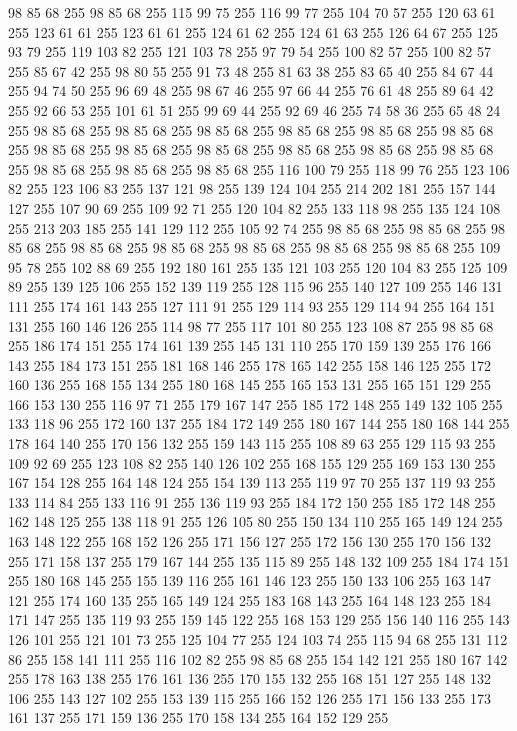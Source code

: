 98 85 68 255 98 85 68 255 115 99 75 255 116 99 77 255 104 70 57 255 120 63 61 255 123 61 61 255 123 61 61 255 124 61 62 255 124 61 63 255 126 64 67 255 125 93 79 255 119 103 82 255 121 103 78 255 97 79 54 255 100 82 57 255 100 82 57 255 85 67 42 255 98 80 55 255 91 73 48 255 81 63 38 255 83 65 40 255 84 67 44 255 94 74 50 255 96 69 48 255 98 67 46 255 97 66 44 255 76 61 48 255 89 64 42 255 92 66 53 255 101 61 51 255 99 69 44 255 92 69 46 255 74 58 36 255 65 48 24 255 98 85 68 255 98 85 68 255 98 85 68 255 98 85 68 255 98 85 68 255 98 85 68 255 98 85 68 255 98 85 68 255 98 85 68 255 98 85 68 255 98 85 68 255 98 85 68 255 98 85 68 255 98 85 68 255 98 85 68 255 116 100 79 255 118 99 76 255 123 106 82 255 123 106 83 255 137 121 98 255 139 124 104 255 214 202 181 255 157 144 127 255 107 90 69 255 109 92 71 255 120 104 82 255 133 118 98 255 135 124 108 255 213 203 185 255
141 129 112 255 105 92 74 255 98 85 68 255 98 85 68 255 98 85 68 255 98 85 68 255 98 85 68 255 98 85 68 255 98 85 68 255 98 85 68 255 109 95 78 255 102 88 69 255 192 180 161 255 135 121 103 255 120 104 83 255 125 109 89 255 139 125 106 255 152 139 119 255 128 115 96 255 140 127 109 255 146 131 111 255 174 161 143 255 127 111 91 255 129 114 93 255 129 114 94 255 164 151 131 255 160 146 126 255 114 98 77 255 117 101 80 255 123 108 87 255 98 85 68 255 186 174 151 255 174 161 139 255 145 131 110 255 170 159 139 255 176 166 143 255 184 173 151 255 181 168 146 255 178 165 142 255 158 146 125 255 172 160 136 255 168 155 134 255 180 168 145 255 165 153 131 255 165 151 129 255 166 153 130 255 116 97 71 255 179 167 147 255 185 172 148 255 149 132 105 255 133 118 96 255 172 160 137 255 184 172 149 255 180 167 144 255 180 168 144 255 178 164 140 255 170 156 132 255 159 143 115 255 108 89 63 255 129 115 93 255 109 92 69 255 123 108 82 255 140 126 102 255 168 155 129 255
169 153 130 255 167 154 128 255 164 148 124 255 154 139 113 255 119 97 70 255 137 119 93 255 133 114 84 255 133 116 91 255 136 119 93 255 184 172 150 255 185 172 148 255 162 148 125 255 138 118 91 255 126 105 80 255 150 134 110 255 165 149 124 255 163 148 122 255 168 152 126 255 171 156 127 255 172 156 130 255 170 156 132 255 171 158 137 255 179 167 144 255 135 115 89 255 148 132 109 255 184 174 151 255 180 168 145 255 155 139 116 255 161 146 123 255 150 133 106 255 163 147 121 255 174 160 135 255 165 149 124 255 183 168 143 255 164 148 123 255 184 171 147 255 135 119 93 255 159 145 122 255 168 153 129 255 156 140 116 255 143 126 101 255 121 101 73 255 125 104 77 255 124 103 74 255 115 94 68 255 131 112 86 255 158 141 111 255 116 102 82 255 98 85 68 255 154 142 121 255 180 167 142 255 178 163 138 255 176 161 136 255 170 155 132 255 168 151 127 255 148 132 106 255 143 127 102 255 153 139 115 255 166 152 126 255 171 156 133 255 173 161 137 255 171 159 136 255 170 158 134 255 164 152 129 255
